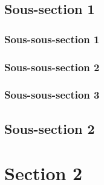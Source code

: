 \lipsum[1]%

\subsection{Sous-section 1}\label{subsec:1_1.1}

\lipsum[1-2]%

\subsubsection{Sous-sous-section 1}\label{subsubsec:1_1.1.1}

\lipsum[1-4]%

\subsubsection{Sous-sous-section 2}\label{subsubsec:1_1.1.2}

\lipsum[1-5]%

\subsubsection{Sous-sous-section 3}\label{subsubsec:1_1.1.3}

\lipsum[1-2]%

\subsection{Sous-section 2}\label{subsec:1_1.2}

\lipsum[1-4]%

\section{Section 2}\label{sec:1_2}


